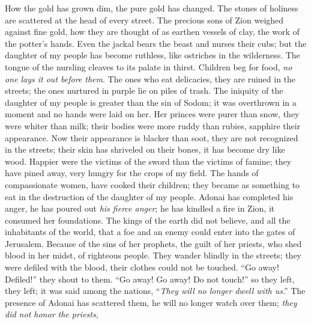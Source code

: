 \begin{biblechapter} %
 How the gold has grown dim, 
the pure gold has changed. 
The stones of holiness are scattered 
at the head of every street.
\verse The precious sons of Zion 
weighed against fine gold, 
how they are thought of as earthen vessels of clay, 
the work of the potter’s hands.
\verse Even the jackal bears the beast 
and nurses their cubs; 
but the daughter of my people has become ruthless, 
like ostriches in the wilderness.
\verse The tongue of the nursling cleaves 
to its palate in thirst. 
Children beg for food, 
\textit{no one lays it out before them}.
\verse The ones who eat delicacies, 
they are ruined in the streets; 
the ones nurtured in purple 
lie on piles of trash.
\verse The iniquity of the daughter of my people is greater 
than the sin of Sodom; 
it was overthrown in a moment 
and no hands were laid on her.
\verse Her princes were purer than snow, 
they were whiter than milk; 
their bodies were more ruddy than rubies, 
sapphire their appearance.
\verse Now their appearance is blacker than soot, 
they are not recognized in the streets; 
their skin has shriveled on their bones, 
it has become dry like wood.
\verse Happier were the victims of the sword 
than the victims of famine; 
they have pined away, very hungry 
for the crops of my field.
\verse The hands of compassionate women, 
have cooked their children; 
they became as something to eat 
in the destruction of the daughter of my people.
\verse Adonai has completed his anger, 
he has poured out \textit{his fierce anger}; 
he has kindled a fire in Zion, 
it consumed her foundations.
\verse The kings of the earth did not believe, 
and all the inhabitants of the world, 
that a foe and an enemy could enter 
into the gates of Jerusalem.
\verse Because of the sins of her prophets, 
the guilt of her priests, 
who shed blood in her midst, 
of righteous people.
\verse They wander blindly in the streets; 
they were defiled with the blood, 
their clothes 
could not be touched.
\verse “Go away! Defiled!” they shout to them. 
“Go away! Go away! Do not touch!” 
so they left, they left; it was said among the nations, 
“\textit{They will no longer dwell with us}.”
\verse The presence of Adonai has scattered them, 
he will no longer watch over them; 
\textit{they did not honor the priests}, 

\end{biblechapter}
